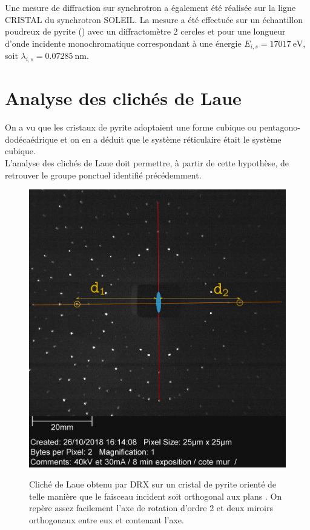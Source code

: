 Une mesure de diffraction sur synchrotron a également été réalisée sur la ligne CRISTAL du synchrotron SOLEIL. La mesure a été effectuée sur un échantillon poudreux de pyrite () avec un diffractomètre 2 cercles et pour une longueur d'onde incidente monochromatique correspondant à une énergie \(E_{i,s} = \SI{17017}{\electronvolt}\), soit \(\lambda_{i,s} = \SI{0.07285}{\nano\metre}\).

\section{Analyse des clichés de Laue}

On a vu que les cristaux de pyrite  adoptaient une forme cubique ou pentagono-dodécaédrique et on en a déduit que le système réticulaire était le système cubique. \\
L'analyse des clichés de Laue doit permettre, à partir de cette hypothèse, de retrouver le groupe ponctuel identifié précédemment.

\begin{figure}
\caption{Cliché de Laue obtenu par DRX sur un cristal de pyrite orienté de telle manière que le faisceau incident soit orthogonal aux plans . On repère assez facilement l'axe de rotation d'ordre 2 et deux miroirs orthogonaux entre eux et contenant l'axe.}
\includegraphics[width=0.85\columnwidth]{figures/Laue_Pyrite_3_symetries}
\label{fig:laueCliche}
\end{figure}

